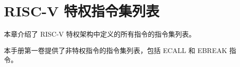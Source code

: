 \chapter{RISC-V 特权指令集列表
}

本章介绍了 RISC-V 特权架构中定义的所有指令的指令集列表。

本手册第一卷提供了非特权指令的指令集列表，包括 ECALL 和 EBREAK 指令。


